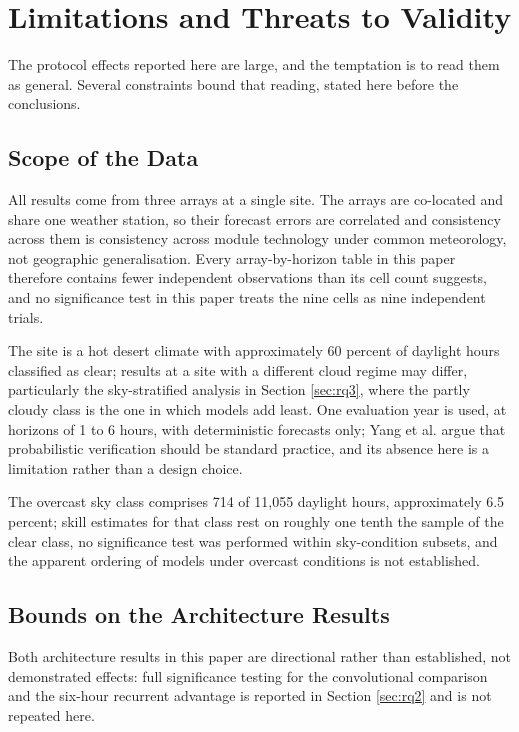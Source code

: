 \section{Limitations and Threats to Validity}
\label{sec:limitations}

The protocol effects reported here are large, and the temptation is to
read them as general. Several constraints bound that reading, stated
here before the conclusions.

\subsection{Scope of the Data}
\label{sec:limitations-scope}

All results come from three arrays at a single site. The arrays are
co-located and share one weather station, so their forecast errors are
correlated and consistency across them is consistency across module
technology under common meteorology, not geographic generalisation.
Every array-by-horizon table in this paper therefore contains fewer
independent observations than its cell count suggests, and no
significance test in this paper treats the nine cells as nine
independent trials.

The site is a hot desert climate with approximately 60 percent of
daylight hours classified as clear; results at a site with a different
cloud regime may differ, particularly the sky-stratified analysis in
Section \ref{sec:rq3}, where the partly cloudy class is the one in which
models add least. One evaluation year is used, at horizons of 1 to 6
hours, with deterministic forecasts only; Yang et al.
\cite{yang2020verification} argue that probabilistic verification
should be standard practice, and its absence here is a limitation
rather than a design choice.

The overcast sky class comprises 714 of 11,055 daylight hours,
approximately 6.5 percent; skill estimates for that class rest on
roughly one tenth the sample of the clear class, no significance test
was performed within sky-condition subsets, and the apparent ordering
of models under overcast conditions is not established.

\subsection{Bounds on the Architecture Results}
\label{sec:limitations-architecture-bounds}

Both architecture results in this paper are directional rather than
established, not demonstrated effects: full significance testing for
the convolutional comparison and the six-hour recurrent advantage is
reported in Section \ref{sec:rq2} and is not repeated here.

